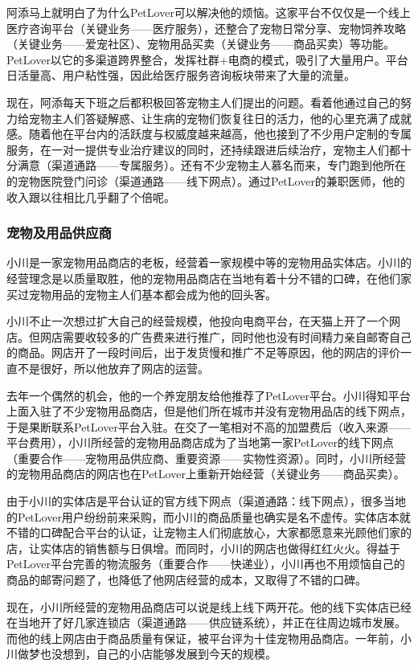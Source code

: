 \documentclass[a4paper]{ctexart}
\begin{document}
阿添马上就明白了为什么PetLover可以解决他的烦恼。这家平台不仅仅是一个线上医疗咨询平台（关键业务——医疗服务），还整合了宠物日常分享、宠物饲养攻略（关键业务——爱宠社区）、宠物用品买卖（关键业务——商品买卖）等功能。PetLover以它的多渠道跨界整合，发挥社群+电商的模式，吸引了大量用户。平台日活量高、用户粘性强，因此给医疗服务咨询板块带来了大量的流量。

现在，阿添每天下班之后都积极回答宠物主人们提出的问题。看着他通过自己的努力给宠物主人们答疑解惑、让生病的宠物们恢复往日的活力，他的心里充满了成就感。随着他在平台内的活跃度与权威度越来越高，他也接到了不少用户定制的专属服务，在一对一提供专业治疗建议的同时，还持续跟进后续治疗，宠物主人们都十分满意（渠道通路——专属服务）。还有不少宠物主人慕名而来，专门跑到他所在的宠物医院登门问诊（渠道通路——线下网点）。通过PetLover的兼职医师，他的收入跟以往相比几乎翻了个倍呢。
\subsubsection{宠物及用品供应商}
小川是一家宠物用品商店的老板，经营着一家规模中等的宠物用品实体店。小川的经营理念是以质量取胜，他的宠物用品商店在当地有着十分不错的口碑，在他们家买过宠物用品的宠物主人们基本都会成为他的回头客。

小川不止一次想过扩大自己的经营规模，他投向电商平台，在天猫上开了一个网店。但网店需要收较多的广告费来进行推广，同时他也没有时间精力亲自邮寄自己的商品。网店开了一段时间后，出于发货慢和推广不足等原因，他的网店的评价一直不是很好，所以他放弃了网店的运营。

去年一个偶然的机会，他的一个养宠朋友给他推荐了PetLover平台。小川得知平台上面入驻了不少宠物用品商店，但是他们所在城市并没有宠物用品店的线下网点，于是果断联系PetLover平台入驻。在交了一笔相对不高的加盟费后（收入来源——平台费用），小川所经营的宠物用品商店成为了当地第一家PetLover的线下网点（重要合作——宠物用品供应商、重要资源——实物性资源）。同时，小川所经营的宠物用品商店的网店也在PetLover上重新开始经营（关键业务——商品买卖）。

由于小川的实体店是平台认证的官方线下网点（渠道通路：线下网点），很多当地的PetLover用户纷纷前来采购，而小川的商品质量也确实是名不虚传。实体店本就不错的口碑配合平台的认证，让宠物主人们彻底放心，大家都愿意来光顾他们家的店，让实体店的销售额与日俱增。而同时，小川的网店也做得红红火火。得益于PetLover平台完善的物流服务（重要合作——快递业），小川再也不用烦恼自己的商品的邮寄问题了，也降低了他网店经营的成本，又取得了不错的口碑。

现在，小川所经营的宠物用品商店可以说是线上线下两开花。他的线下实体店已经在当地开了好几家连锁店（渠道通路——供应链系统），并正在往周边城市发展。而他的线上网店由于商品质量有保证，被平台评为十佳宠物用品商店。一年前，小川做梦也没想到，自己的小店能够发展到今天的规模。
\end{document}
